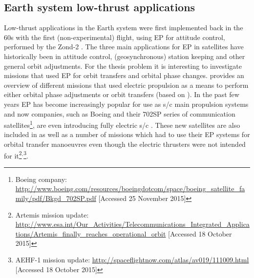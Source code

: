 \subsection{Earth system low-thrust applications}
\label{subsec:earthlowthrust}
Low-thrust applications in the Earth system were first implemented back in the 60s with the first (non-experimental) flight, using \ac{EP} for attitude control, performed by the Zond-2 \cite{martinez1998spacecraft}. The three main applications for \ac{EP} in satellites have historically been in attitude control, (geosynchronous) station keeping and other general orbit adjustments. For the thesis problem it is interesting to investigate missions that used \ac{EP} for orbit transfers and orbital phase changes.  provides an overview of different missions that used electric propulsion  as a means to perform either orbital phase adjustments or orbit transfers (based on \cite{martinez1998spacecraft}). In the past few years \ac{EP} has become increasingly popular for use as \ac{s/c} main propulsion systems and now companies, such as Boeing and their 702SP series of communication satellites\footnote{Boeing company: \url{http://www.boeing.com/resources/boeingdotcom/space/boeing_satellite_family/pdf/Bkgd_702SP.pdf} [Accessed 25 November 2015]}, are even introducing fully electric \ac{s/c} \cite{schaeff2014low}. These new satellites are also included in  as well as a number of missions which had to use their \ac{EP} systems for orbital transfer manoeuvres even though the electric thrusters were not intended for it\footnote{Artemis mission update: \url{http://www.esa.int/Our_Activities/Telecommunications_Integrated_Applications/Artemis_finally_reaches_operational_orbit} [Accessed 18 October 2015]}$^{,}$\footnote{AEHF-1 mission update: \url{http://spaceflightnow.com/atlas/av019/111009.html} [Accessed 18 October 2015]}. 


